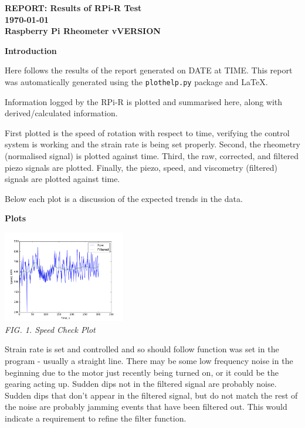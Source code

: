 \documentclass{article}
\begin{document}
	
	\twocolumn {}
	
	{\centering\Large\bfseries REPORT: \normalfont Results of RPi-R Test\\ \normalsize\today \\ Raspberry Pi Rheometer vVERSION\\}
	
	\vskip0.5cm \noindent
	{\centering\textbf{Introduction}\\}
	
	Here follows the results of the report generated on DATE at TIME. This report was automatically generated using the \texttt{plothelp.py} package and \LaTeX.
	
	Information logged by the RPi-R is plotted and summarised here, along with derived/calculated information.
	
	First plotted is the speed of rotation with respect to time, verifying the control system is working and the strain rate is being set properly. Second, the rheometry (normalised signal) is plotted against time. Third, the raw, corrected, and filtered piezo signals are plotted. Finally, the piezo, speed, and viscometry (filtered) signals are plotted against time.
	
	Below each plot is a discussion of the expected trends in the data.
	
	\vskip0.25cm \noindent
	{\centering\textbf{Plots}\\}
	
	{\centering \includegraphics[width=0.4\textwidth]{strain_check.png}\\
	\textit{FIG. 1. Speed Check Plot}\\}

	Strain rate is set and controlled and so should follow function was set in the program - usually a straight line. There may be some low frequency noise in the beginning due to the motor just recently being turned on, or it could be the gearing acting up. Sudden dips not in the filtered signal are probably noise. Sudden dips that don't appear in the filtered signal, but do not match the rest of the noise are probably jamming events that have been filtered out. This would indicate a requirement to refine the filter function.
\end{document}
